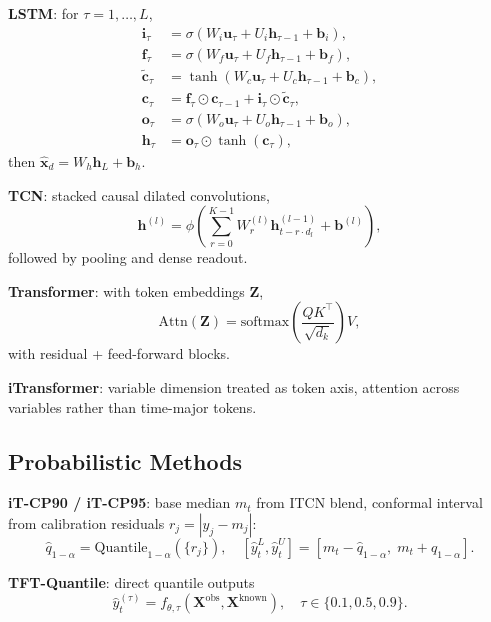 \documentclass[journal]{IEEEtran}
\begin{document}
\textbf{LSTM}: for $\tau=1,\dots,L$,
\begin{align}
\mathbf{i}_\tau &= \sigma(W_i\mathbf{u}_\tau+U_i\mathbf{h}_{\tau-1}+\mathbf{b}_i),\\
\mathbf{f}_\tau &= \sigma(W_f\mathbf{u}_\tau+U_f\mathbf{h}_{\tau-1}+\mathbf{b}_f),\\
\tilde{\mathbf{c}}_\tau &= \tanh(W_c\mathbf{u}_\tau+U_c\mathbf{h}_{\tau-1}+\mathbf{b}_c),\\
\mathbf{c}_\tau &= \mathbf{f}_\tau\odot\mathbf{c}_{\tau-1}+\mathbf{i}_\tau\odot\tilde{\mathbf{c}}_\tau,\\
\mathbf{o}_\tau &= \sigma(W_o\mathbf{u}_\tau+U_o\mathbf{h}_{\tau-1}+\mathbf{b}_o),\\
\mathbf{h}_\tau &= \mathbf{o}_\tau\odot\tanh(\mathbf{c}_\tau),
\end{align}
then $\hat{\mathbf{x}}_d=W_h\mathbf{h}_L+\mathbf{b}_h$.

\textbf{TCN}: stacked causal dilated convolutions,
\begin{equation}
\mathbf{h}^{(l)} = \phi\left(\sum_{r=0}^{K-1} W^{(l)}_{r}\mathbf{h}^{(l-1)}_{t-r\cdot d_l}+\mathbf{b}^{(l)}\right),
\end{equation}
followed by pooling and dense readout.

\textbf{Transformer}: with token embeddings $\mathbf{Z}$,
\begin{equation}
\mathrm{Attn}(\mathbf{Z})=\mathrm{softmax}\left(\frac{QK^\top}{\sqrt{d_k}}\right)V,
\end{equation}
with residual + feed-forward blocks.

\textbf{iTransformer}: variable dimension treated as token axis, attention across variables rather than time-major tokens.

\subsection{Probabilistic Methods}
\textbf{iT-CP90 / iT-CP95}: base median $m_t$ from ITCN blend, conformal interval from calibration residuals $r_j=|y_j-m_j|$:
\begin{equation}
\hat{q}_{1-\alpha}=\mathrm{Quantile}_{1-\alpha}(\{r_j\}),
\quad [\hat{y}^{L}_t,\hat{y}^{U}_t]=[m_t-\hat{q}_{1-\alpha},\;m_t+\hat{q}_{1-\alpha}].
\end{equation}

\textbf{TFT-Quantile}: direct quantile outputs
\begin{equation}
\hat{y}^{(\tau)}_t=f_{\theta,\tau}(\mathbf{X}^{\mathrm{obs}},\mathbf{X}^{\mathrm{known}}),\quad \tau\in\{0.1,0.5,0.9\}.
\end{equation}
\end{document}
